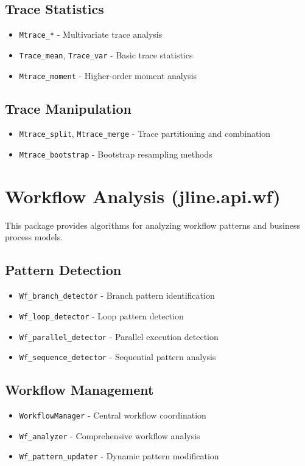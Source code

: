 \subsection{Trace Statistics}
\begin{itemize}
\item \texttt{Mtrace\_*} - Multivariate trace analysis
\item \texttt{Trace\_mean}, \texttt{Trace\_var} - Basic trace statistics
\item \texttt{Mtrace\_moment} - Higher-order moment analysis
\end{itemize}

\subsection{Trace Manipulation}
\begin{itemize}
\item \texttt{Mtrace\_split}, \texttt{Mtrace\_merge} - Trace partitioning and combination
\item \texttt{Mtrace\_bootstrap} - Bootstrap resampling methods
\end{itemize}

\section{Workflow Analysis (jline.api.wf)}

This package provides algorithms for analyzing workflow patterns and business process models.

\subsection{Pattern Detection}
\begin{itemize}
\item \texttt{Wf\_branch\_detector} - Branch pattern identification
\item \texttt{Wf\_loop\_detector} - Loop pattern detection
\item \texttt{Wf\_parallel\_detector} - Parallel execution detection
\item \texttt{Wf\_sequence\_detector} - Sequential pattern analysis
\end{itemize}

\subsection{Workflow Management}
\begin{itemize}
\item \texttt{WorkflowManager} - Central workflow coordination
\item \texttt{Wf\_analyzer} - Comprehensive workflow analysis
\item \texttt{Wf\_pattern\_updater} - Dynamic pattern modification
\end{itemize}


